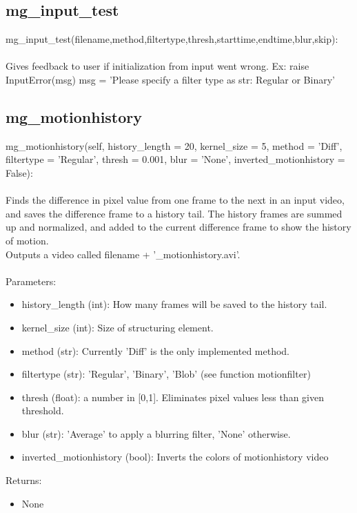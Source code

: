 \documentclass[9pt]{extarticle}
\begin{document}
\subsection{mg\_input\_test}
    mg\_input\_test(filename,method,filtertype,thresh,starttime,endtime,blur,skip): 
    \\\\
    Gives feedback to user if initialization from input went wrong.
    Ex: raise InputError(msg)
    msg = 'Please specify a filter type as str: Regular or Binary'


\subsection{mg\_motionhistory} 
    mg\_motionhistory(self, history\_length = 20, kernel\_size = 5, method = 'Diff', filtertype = 'Regular', thresh = 0.001, blur = 'None', inverted\_motionhistory = False):
    \\\\
    Finds the difference in pixel value from one frame to the next in an input video, and saves the difference frame to a history tail. 
    The history frames are summed up and normalized, and added to the current difference frame to show the history of motion. \\
    Outputs a video called filename + '\_motionhistory.avi'.
\\\\
    Parameters:
    \begin{itemize}
    \item []history\_length (int): How many frames will be saved to the history tail.
    \item []kernel\_size (int): Size of structuring element.
    \item []method (str): Currently 'Diff' is the only implemented method. 
    \item []filtertype (str): 'Regular', 'Binary', 'Blob' (see function motionfilter) 
	\item []thresh (float): a number in [0,1]. Eliminates pixel values less than given threshold.
    \item []blur (str): 'Average' to apply a blurring filter, 'None' otherwise.
    \item [] inverted\_motionhistory (bool): Inverts the colors of motionhistory video
    \end{itemize}
    Returns:
    \begin{itemize}
    \item [] None
\end{itemize}
\end{document}
